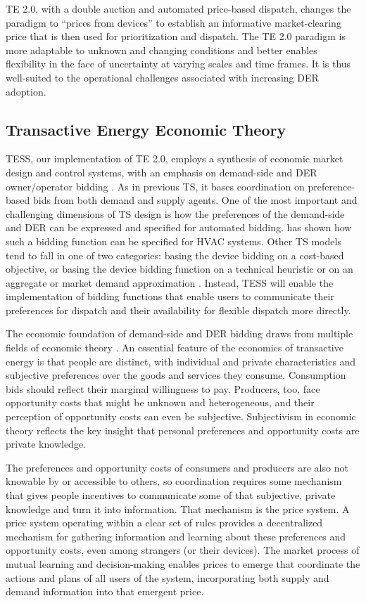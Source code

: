 TE 2.0, with a double auction and automated price-based dispatch, changes the paradigm to ``prices from devices'' to establish an informative market-clearing price that is then used for prioritization and dispatch. The TE 2.0 paradigm is more adaptable to unknown and changing conditions and better enables flexibility in the face of uncertainty at varying scales and time frames. It is thus well-suited to the operational challenges associated with increasing DER adoption.

\subsection{Transactive Energy Economic Theory}\label{sec:teecon}

TESS, our implementation of TE 2.0, employs a synthesis of economic market design and control systems, with an emphasis on demand-side and DER owner/operator bidding \citep{chassin2017thesis}. 
As in previous TS, it bases coordination on preference-based bids from both demand and supply agents. 
One of the most important and challenging dimensions of TS design is how the preferences of the demand-side and DER can be expressed and specified for automated bidding. 
\citet[Chapter IV]{Arlt2020} has shown how such a bidding function can be specified for HVAC systems.
Other TS models tend to fall in one of two categories: basing the device bidding on a cost-based objective, or basing the device bidding function on a technical heuristic or on an aggregate or market demand approximation \citep[Chapter IV]{Arlt2020}. Instead, TESS will enable the implementation of bidding functions that enable users to communicate their preferences for dispatch and their availability for flexible dispatch more directly.

The economic foundation of demand-side and DER bidding draws from multiple fields of economic theory \citep{kiesling_2021}. An essential feature of the economics of transactive energy is that people are distinct, with individual and private characteristics and subjective preferences over the goods and services they consume. Consumption bids should reflect their marginal willingness to pay. Producers, too, face opportunity costs that might be unknown and heterogeneous, and their perception of opportunity costs can even be subjective. Subjectivism in economic theory reflects the key insight that personal preferences and opportunity costs are private knowledge.

The preferences and opportunity costs of consumers and producers are also not knowable by or accessible to others, so coordination requires some mechanism that gives people incentives to communicate some of that subjective, private knowledge and turn it into information. That mechanism is the price system. A price system operating within a clear set of rules provides a decentralized mechanism for gathering information and learning about these preferences and opportunity costs, even among strangers (or their devices). The market process of mutual learning and decision-making enables prices to emerge that coordinate the actions and plans of all users of the system, incorporating both supply and demand information into that emergent price.

